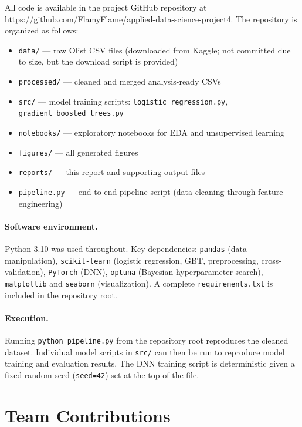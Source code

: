 \documentclass[11pt]{article}
\begin{document}
All code is available in the project GitHub repository at \url{https://github.com/FlamyFlame/applied-data-science-project4}. The repository is organized as follows:

\begin{itemize}[noitemsep]
  \item \texttt{data/} --- raw Olist CSV files (downloaded from Kaggle; not committed due to size, but the download script is provided)
  \item \texttt{processed/} --- cleaned and merged analysis-ready CSVs
  \item \texttt{src/} --- model training scripts: \texttt{logistic\_regression.py}, \texttt{gradient\_boosted\_trees.py}
  \item \texttt{notebooks/} --- exploratory notebooks for EDA and unsupervised learning
  \item \texttt{figures/} --- all generated figures
  \item \texttt{reports/} --- this report and supporting output files
  \item \texttt{pipeline.py} --- end-to-end pipeline script (data cleaning through feature engineering)
\end{itemize}

\paragraph{Software environment.}
Python 3.10 was used throughout. Key dependencies: \texttt{pandas} (data manipulation), \texttt{scikit-learn} (logistic regression, GBT, preprocessing, cross-validation), \texttt{PyTorch} (DNN), \texttt{optuna} (Bayesian hyperparameter search), \texttt{matplotlib} and \texttt{seaborn} (visualization). A complete \texttt{requirements.txt} is included in the repository root.

\paragraph{Execution.}
Running \texttt{python pipeline.py} from the repository root reproduces the cleaned dataset. Individual model scripts in \texttt{src/} can then be run to reproduce model training and evaluation results. The DNN training script is deterministic given a fixed random seed (\texttt{seed=42}) set at the top of the file.

\section{Team Contributions}
\end{document}
